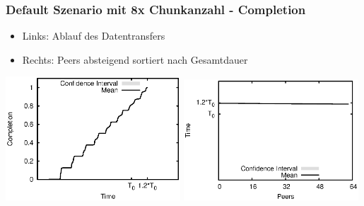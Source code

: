 \begin{frame}
  \frametitle{Default Szenario mit 8x Chunkanzahl - Completion}
  \begin{itemize}  
    \item Links: Ablauf des Datentransfers
    \item Rechts: Peers absteigend sortiert nach Gesamtdauer
  \end{itemize}

  \begin{center}
    \includegraphics[width=0.49\textwidth]{fig/plots/scenario_16_chunk_count_fac_8/plots/GeneratedMeanChunkCompletion.csv.eps}
    \hfill
    \includegraphics[width=0.49\textwidth]{fig/plots/scenario_16_chunk_count_fac_8/plots/GeneratedMeanSortedChunkCompletion.csv.eps}
  \end{center}
\end{frame}


